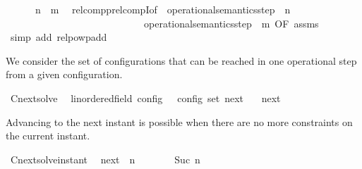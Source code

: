 \begin{isabellebody}
\ \ \ \ \ {\isacartoucheopen}{\isasymC}\ {\isasymhookrightarrow}\isactrlbsup n\ {\isacharplus}\ m\isactrlesup \ {\isasymC}\isanewline
%
\isadelimproof
%
\endisadelimproof
%
\isatagproof
{}\isamarkupfalse%
\ relcompp{\isachardot}relcompI{\isacharbrackleft}of\ \ {\isacartoucheopen}operational{\isacharunderscore}semantics{\isacharunderscore}step\ {\isacharcircum}{\isacharcircum}\ n{\isacartoucheclose}\ {\isacharunderscore}\ {\isacharunderscore}\ \isanewline
\ \ \ \ \ \ \ \ \ \ \ \ \ \ \ \ \ \ \ \ \ \ \ \ \ \ \ \ {\isacartoucheopen}operational{\isacharunderscore}semantics{\isacharunderscore}step\ {\isacharcircum}{\isacharcircum}\ m{\isacartoucheclose}{\isacharcomma}\ OF\ assms{\isacharbrackright}\isanewline
{}\isamarkupfalse%
\ {\isacharparenleft}simp\ add{\isacharcolon}\ relpowp{\isacharunderscore}add{\isacharparenright}%
\endisatagproof
{\isafoldproof}%
%
\isadelimproof
%
\endisadelimproof
%
\begin{isamarkuptext}%
We consider the set of configurations that can be reached in one operational
  step from a given configuration.%
\end{isamarkuptext}\isamarkuptrue%
\isamarkupfalse%
\ Cnext{\isacharunderscore}solve\isanewline
\ \ {\isacharcolon}{\isacharcolon}{\isacartoucheopen}{\isacharparenleft}{\isacharprime}{\isasymtau}{\isacharcolon}{\isacharcolon}linordered{\isacharunderscore}field{\isacharparenright}\ config\ {\isasymRightarrow}\ {\isacharprime}{\isasymtau}\ config\ set{\isacartoucheclose}\ {\isacharparenleft}{\isacartoucheopen}{\isasymC}\isactrlsub n\isactrlsub e\isactrlsub x\isactrlsub t\ {\isacharunderscore}{\isacartoucheclose}{\isacharparenright}\isanewline
{}\isanewline
\ \ {\isacartoucheopen}{\isasymC}\isactrlsub n\isactrlsub e\isactrlsub x\isactrlsub t\ {\isasymS}\ {\isasymequiv}\ {\isacharbraceleft}\ {\isasymS}{\isacharprime}{\isachardot}\ {\isasymS}\ {\isasymhookrightarrow}\ {\isasymS}{\isacharprime}\ {\isacharbraceright}{\isacartoucheclose}%
\begin{isamarkuptext}%
Advancing to the next instant is possible when there are no more constraints 
  on the current instant.%
\end{isamarkuptext}\isamarkuptrue%
\isamarkupfalse%
\ Cnext{\isacharunderscore}solve{\isacharunderscore}instant{\isacharcolon}\isanewline
\ \ {\isacartoucheopen}{\isacharparenleft}{\isasymC}\isactrlsub n\isactrlsub e\isactrlsub x\isactrlsub t\ {\isacharparenleft}{\isasymGamma}{\isacharcomma}\ n\ {\isasymturnstile}\ {\isacharbrackleft}{\isacharbrackright}\ {\isasymtriangleright}\ {\isasymPhi}{\isacharparenright}{\isacharparenright}\ {\isasymsupseteq}\ {\isacharbraceleft}\ {\isasymGamma}{\isacharcomma}\ Suc\ n\ {\isasymturnstile}\ {\isasymPhi}\ {\isasymtriangleright}\ {\isacharbrackleft}{\isacharbrackright}\ {\isacharbraceright}{\isacartoucheclose}\isanewline

\end{isabellebody}
